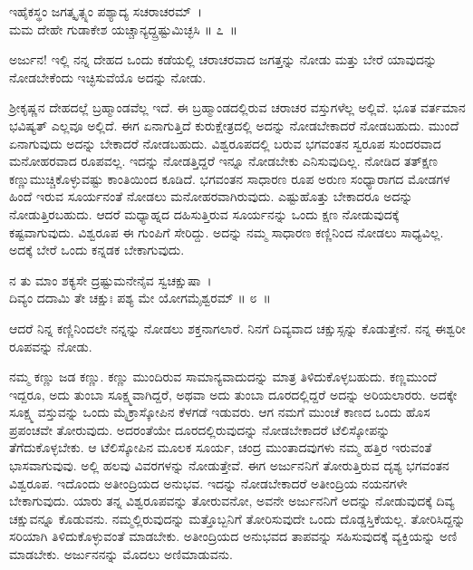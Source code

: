 \begin{shloka}
ಇಹೈಕಸ್ಥಂ ಜಗತ್ಕೃತ್ಸ್ನಂ ಪಶ್ಯಾದ್ಯ ಸಚರಾಚರಮ್~।\\ಮಮ ದೇಹೇ ಗುಡಾಕೇಶ ಯಚ್ಚಾನ್ಯದ್ದ್ರಷ್ಟುಮಿಚ್ಛಸಿ \hfill॥ ೭~॥
\end{shloka}

\begin{artha}
ಅರ್ಜುನ! ಇಲ್ಲಿ ನನ್ನ ದೇಹದ ಒಂದು ಕಡೆಯಲ್ಲಿ ಚರಾಚರವಾದ ಜಗತ್ತನ್ನು ನೋಡು ಮತ್ತು ಬೇರೆ ಯಾವುದನ್ನು ನೋಡಬೇಕೆಂದು ಇಚ್ಛಿಸುವೆಯೊ ಅದನ್ನು ನೋಡು.
\end{artha}

ಶ‍್ರೀಕೃಷ್ಣನ ದೇಹದಲ್ಲೆ ಬ್ರಹ್ಮಾಂಡವೆಲ್ಲ ಇದೆ. ಈ ಬ್ರಹ್ಮಾಂಡದಲ್ಲಿರುವ ಚರಾಚರ ವಸ್ತುಗಳೆಲ್ಲ ಅಲ್ಲಿವೆ. ಭೂತ ವರ್ತಮಾನ ಭವಿಷ್ಯತ್ ಎಲ್ಲವೂ ಅಲ್ಲಿದೆ. ಈಗ ಏನಾಗುತ್ತಿದೆ ಕುರುಕ್ಷೇತ್ರದಲ್ಲಿ ಅದನ್ನು ನೋಡಬೇಕಾದರೆ ನೋಡಬಹುದು. ಮುಂದೆ ಏನಾಗುವುದು ಅದನ್ನು ಬೇಕಾದರೆ ನೋಡಬಹುದು. ವಿಶ್ವರೂಪದಲ್ಲಿ ಬರುವ ಭಗವಂತನ ಸ್ವರೂಪ ಸುಂದರವಾದ ಮನೋಹರವಾದ ರೂಪವಲ್ಲ. ಇದನ್ನು ನೋಡತ್ತಿದ್ದರೆ ಇನ್ನೂ ನೋಡಬೇಕು ಎನಿಸುವುದಿಲ್ಲ. ನೋಡಿದ ತತ್​ಕ್ಷಣ ಕಣ್ಣುಮುಚ್ಚಿಕೊಳ್ಳುವಷ್ಟು ಕಾಂತಿಯಿಂದ ಕೂಡಿದೆ. ಭಗವಂತನ ಸಾಧಾರಣ ರೂಪ ಅರುಣ ಸಂಧ್ಯಾರಾಗದ ಮೋಡಗಳ ಹಿಂದೆ ಇರುವ ಸೂರ್ಯನಂತೆ ನೋಡಲು ಮನೋಹರವಾಗಿರುವುದು. ಎಷ್ಟುಹೊತ್ತು ಬೇಕಾದರೂ ಅದನ್ನು ನೋಡುತ್ತಿರಬಹುದು. ಆದರೆ ಮಧ್ಯಾಹ್ನದ ದಹಿಸುತ್ತಿರುವ ಸೂರ್ಯನನ್ನು ಒಂದು ಕ್ಷಣ ನೋಡುವುದಕ್ಕೆ ಕಷ್ಟವಾಗುವುದು. ವಿಶ್ವರೂಪ ಈ ಗುಂಪಿಗೆ ಸೇರಿದ್ದು. ಅದನ್ನು ನಮ್ಮ ಸಾಧಾರಣ ಕಣ್ಣಿನಿಂದ ನೋಡಲು ಸಾಧ್ಯವಿಲ್ಲ. ಅದಕ್ಕೆ ಬೇರೆ ಒಂದು ಕನ್ನಡಕ ಬೇಕಾಗುವುದು.

\begin{shloka}
ನ ತು ಮಾಂ ಶಕ್ಯಸೇ ದ್ರಷ್ಟುಮನೇನೈವ ಸ್ವಚಕ್ಷುಷಾ~।\\ದಿವ್ಯಂ ದದಾಮಿ ತೇ ಚಕ್ಷುಃ ಪಶ್ಯ ಮೇ ಯೋಗಮೈಶ್ವರಮ್ \hfill॥ ೮~॥
\end{shloka}

\begin{artha}
ಆದರೆ ನಿನ್ನ ಕಣ್ಣಿನಿಂದಲೇ ನನ್ನನ್ನು ನೋಡಲು ಶಕ್ತನಾಗಲಾರೆ. ನಿನಗೆ ದಿವ್ಯವಾದ ಚಕ್ಷುಸ್ಸನ್ನು ಕೊಡುತ್ತೇನೆ. ನನ್ನ ಈಶ್ವರೀ ರೂಪವನ್ನು ನೋಡು.
\end{artha}

ನಮ್ಮ ಕಣ್ಣು ಜಡ ಕಣ್ಣು. ಕಣ್ಣು ಮುಂದಿರುವ ಸಾಮಾನ್ಯವಾದುದನ್ನು ಮಾತ್ರ ತಿಳಿದುಕೊಳ್ಳಬಹುದು. ಕಣ್ಣಮುಂದೆ ಇದ್ದರೂ, ಅದು ತುಂಬಾ ಸೂಕ್ಷ್ಮವಾಗಿದ್ದರೆ, ಅಥವಾ ಅದು ತುಂಬಾ ದೂರದಲ್ಲಿದ್ದರೆ ಅದನ್ನು ಅರಿಯಲಾರರು. ಅದಕ್ಕೇ ಸೂಕ್ಷ್ಮ ವಸ್ತುವನ್ನು ಒಂದು ಮೈಕ್ರಾಸ್ಕೋಪಿನ ಕೆಳಗಡೆ ಇಡುವರು. ಆಗ ನಮಗೆ ಮುಂಚೆ ಕಾಣದ ಒಂದು ಹೊಸ ಪ್ರಪಂಚವೇ ತೋರುವುದು. ಅದರಂತೆಯೇ ದೂರದಲ್ಲಿರುವುದನ್ನು ನೋಡಬೇಕಾದರೆ ಟೆಲಿಸ್ಕೋಪನ್ನು ತೆಗೆದುಕೊಳ್ಳಬೇಕು. ಆ ಟೆಲಿಸ್ಕೋಪಿನ ಮೂಲಕ ಸೂರ್ಯ, ಚಂದ್ರ ಮುಂತಾದವುಗಳು ನಮ್ಮ ಹತ್ತಿರ ಇರುವಂತೆ ಭಾಸವಾಗುವುವು. ಅಲ್ಲಿ ಹಲವು ವಿವರಗಳನ್ನು ನೋಡುತ್ತೇವೆ. ಈಗ ಅರ್ಜುನನಿಗೆ ತೋರುತ್ತಿರುವ ದೃಶ್ಯ ಭಗವಂತನ ವಿಶ್ವರೂಪ. ಇದೊಂದು ಅತೀಂದ್ರಿಯದ ಅನುಭವ. ಇದನ್ನು ನೋಡಬೇಕಾದರೆ ಅತೀಂದ್ರಿಯ ನಯನಗಳೇ ಬೇಕಾಗುವುದು. ಯಾರು ತನ್ನ ವಿಶ್ವರೂಪವನ್ನು ತೋರುವನೋ, ಅವನೇ ಅರ್ಜುನನಿಗೆ ಅದನ್ನು ನೋಡುವುದಕ್ಕೆ ದಿವ್ಯ ಚಕ್ಷುವನ್ನೂ ಕೊಡುವನು. ನಮ್ಮಲ್ಲಿರುವುದನ್ನು ಮತ್ತೊಬ್ಬನಿಗೆ ತೋರಿಸುವುದೇ ಒಂದು ದೊಡ್ಡಸ್ತಿಕೆಯಲ್ಲ. ತೋರಿಸಿದ್ದನ್ನು ಸರಿಯಾಗಿ ತಿಳಿದುಕೊಳ್ಳುವಂತೆ ಮಾಡಬೇಕು. ಅತೀಂದ್ರಿಯದ ಅನುಭವದ ತಾಪವನ್ನು ಸಹಿಸುವುದಕ್ಕೆ ವ್ಯಕ್ತಿಯನ್ನು ಅಣಿ ಮಾಡಬೇಕು. ಅರ್ಜುನನನ್ನು ಮೊದಲು ಅಣಿಮಾಡುವನು.


